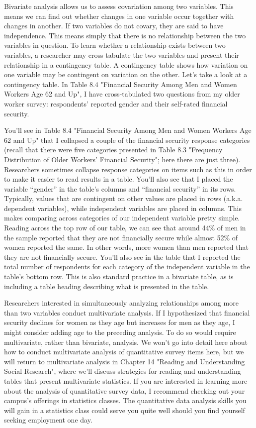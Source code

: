 Bivariate analysis allows us to assess covariation among two variables. This means we can find out whether changes in one variable occur together with changes in another. If two variables do not covary, they are said to have independence. This means simply that there is no relationship between the two variables in question. To learn whether a relationship exists between two variables, a researcher may cross-tabulate the two variables and present their relationship in a contingency table. A contingency table shows how variation on one variable may be contingent on variation on the other. Let’s take a look at a contingency table. In Table 8.4 "Financial Security Among Men and Women Workers Age 62 and Up", I have cross-tabulated two questions from my older worker survey: respondents’ reported gender and their self-rated financial security.

You’ll see in Table 8.4 "Financial Security Among Men and Women Workers Age 62 and Up" that I collapsed a couple of the financial security response categories (recall that there were five categories presented in Table 8.3 "Frequency Distribution of Older Workers’ Financial Security"; here there are just three). Researchers sometimes collapse response categories on items such as this in order to make it easier to read results in a table. You’ll also see that I placed the variable “gender” in the table’s columns and “financial security” in its rows. Typically, values that are contingent on other values are placed in rows (a.k.a. dependent variables), while independent variables are placed in columns. This makes comparing across categories of our independent variable pretty simple. Reading across the top row of our table, we can see that around 44\% of men in the sample reported that they are not financially secure while almost 52\% of women reported the same. In other words, more women than men reported that they are not financially secure. You’ll also see in the table that I reported the total number of respondents for each category of the independent variable in the table’s bottom row. This is also standard practice in a bivariate table, as is including a table heading describing what is presented in the table.

Researchers interested in simultaneously analyzing relationships among more than two variables conduct multivariate analysis. If I hypothesized that financial security declines for women as they age but increases for men as they age, I might consider adding age to the preceding analysis. To do so would require multivariate, rather than bivariate, analysis. We won’t go into detail here about how to conduct multivariate analysis of quantitative survey items here, but we will return to multivariate analysis in Chapter 14 "Reading and Understanding Social Research", where we’ll discuss strategies for reading and understanding tables that present multivariate statistics. If you are interested in learning more about the analysis of quantitative survey data, I recommend checking out your campus’s offerings in statistics classes. The quantitative data analysis skills you will gain in a statistics class could serve you quite well should you find yourself seeking employment one day.


